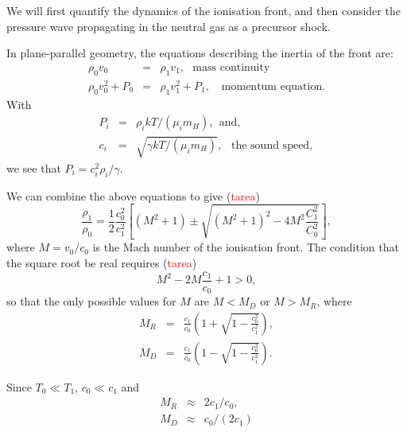 We will first quantify the dynamics of the ionisation front, and then
consider the pressure wave propagating in the neutral gas as a
precursor shock. 


In plane-parallel geometry, the equations describing the inertia of
the front are:
\begin{eqnarray}
\rho_0 v_0  & = & \rho_1 v_1 , \text{~~mass continuity} \\
\rho_0 v_0^2 + P_0  &    =   & \rho_1 v_1^2 + P_1,  \text{~~ momentum equation}.
\end{eqnarray}
With 
\begin{eqnarray}
P_i &  =  &  \rho_i k T / (\mu_i m_H) , ~~\text{and}, ~\\
c_i  & = & \sqrt{\gamma k T /  (\mu_i m_H) } , ~~\text{ the sound
  speed}, 
\end{eqnarray}
we see that $P_i = c_i^2 \rho_i / \gamma$. 


We can combine the above equations to give (\textcolor{red}{tarea})
\begin{equation}
\frac{\rho_1}{\rho_0} =  \frac{1}{2} \frac{c_0^2}{c_1^2} \left[
(M^2 + 1) \pm \sqrt{ (M^2+1)^2 - 4M^2 \frac{C_1^2}{C_0^2}} 
\right] , \label{eq:rhofrac}
\end{equation}
where $M = v_0 /c_0 $ is the Mach number of the ionisation front. 
The condition that the square root be real requires 
(\textcolor{red}{tarea})
\begin{equation}
M^2 - 2M \frac{c_1}{c_0} + 1 > 0, 
\end{equation}
so that the only possible values for $M$ are $ M < M_D$ or $ M > M_R$,
where 
\begin{eqnarray}
M_R  & =  & \frac{c_1}{c_0} \left( 1 + \sqrt{ 1 - \frac{c_0^2}{c_1^2} }
\right), \\
M_D  & =  & \frac{c_1}{c_0} \left( 1 - \sqrt{ 1 - \frac{c_0^2}{c_1^2} }
\right). 
\end{eqnarray}




Since $T_0\ll T_1$, $c_0 \ll c_1$ and 
\begin{eqnarray}
M_R  & \approx  & 2 c_1/c_0, \\
M_D  & \approx  & c_0/ (2 c_1)
\end{eqnarray}

